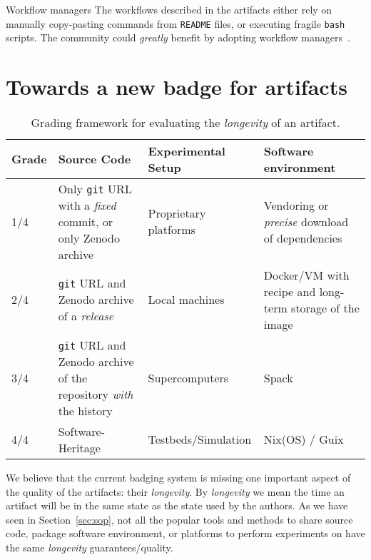 \documentclass[sigconf,natbib=false]{acmart}
\newcommand{\todo}[1]{{\color{red}{TODO: #1}}}
\begin{document}
\begin{lesson}{Workflow managers}{}
  The workflows described in the artifacts either rely on manually copy-pasting commands from \texttt{README} files, or executing fragile \texttt{bash} scripts.
  The community could \emph{greatly} benefit by adopting workflow managers\ \cite{wratten2021reproducible}.
\end{lesson}

% 

%
\section{Towards a new badge for artifacts}\label{sec:longevity}

\begin{table*}
  \caption{\label{tab:longevity}Grading framework for evaluating the \emph{longevity} of an artifact.}
  \centering
  \begin{tabular}[t]{l p{18em} p{9em} p{22em}}
  \toprule
    Grade & Source Code &  Experimental Setup & Software environment \\
  \midrule
    1/4 & Only \texttt{git} URL with a \emph{fixed} commit, or only Zenodo archive & Proprietary platforms & Vendoring or \emph{precise} download of dependencies \\
    2/4 & \texttt{git} URL and Zenodo archive of a \emph{release} & Local machines & Docker/VM with recipe and long-term storage of the image \\
    3/4 & \texttt{git} URL and Zenodo archive of the repository \emph{with} the history & Supercomputers & Spack \\
    4/4 & Software-Heritage & Testbeds/Simulation  & Nix(OS) / Guix \\
  \bottomrule
  \end{tabular}
\end{table*}

We believe that the current badging system is missing one important aspect of the quality of the artifacts: their \emph{longevity}.
By \emph{longevity} we mean the time an artifact will be in the same state as the state used by the authors.
As we have seen in Section\ \ref{sec:sop}, not all the popular tools and methods to share source code, package software environment, or platforms to perform experiments on have the same \emph{longevity} guarantees/quality.
\end{document}
